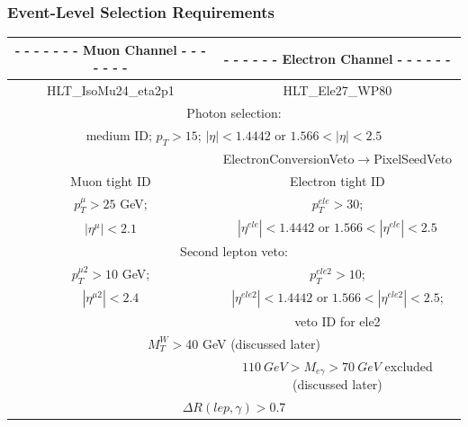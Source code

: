 \begin{frame}\frametitle{Event-Level Selection Requirements}
\begin{table}[h]
\scriptsize
\begin{center}
\begin{tabular}{|c|c|}
{\footnotesize\bfseries{- - - - - - - Muon Channel - - - - - - -}} & 
{\footnotesize\bfseries{- - - - - - Electron Channel - - - - - -}}\\ \hline
 {\scriptsize{HLT\_IsoMu24\_eta2p1}} &  {\scriptsize{HLT\_Ele27\_WP80}}  \\ \hline
 \multicolumn{2}{|c|}{Photon selection:}\\
 \multicolumn{2}{|c|}{\tiny{medium ID; $p_T>15$; $|\eta| < 1.4442$ or $1.566 < |\eta| < 2.5$}}\\ 
               &{\tiny{ ElectronConversionVeto$\rightarrow$PixelSeedVeto}} \\ \hline
 Muon tight ID & Electron tight ID \\ \hline
 \tiny{$p_T^{\mu}>25$ GeV;} &  \tiny{$p_T^{ele}>30$;}  \\ 
 \tiny{$|\eta^{\mu}|<2.1$} & \tiny{$|\eta^{ele}| < 1.4442$ or $1.566 < |\eta^{ele}| < 2.5$} \\ \hline
 \multicolumn{2}{|c|}{Second lepton veto:}\\
 \tiny{$p_T^{\mu2}>10$ GeV;} &  \tiny{$p_T^{ele2}>10$;} \\
 \tiny{$|\eta^{\mu2}|<2.4$}  &   \tiny{$|\eta^{ele2}| < 1.4442$ or $1.566 < |\eta^{ele2}| < 2.5$;} \\
  &   \tiny{veto ID for ele2} \\ \hline
 \multicolumn{2}{|c|}{$M_T^W>$40 GeV (discussed later)} \\ \hline
  & $110~GeV>M_{e\gamma}>70~GeV$ excluded (discussed later) \\ \hline
 \multicolumn{2}{|c|}{$\Delta{R}(lep,\gamma)>0.7$}\\  \hline
\end{tabular}
\end{center}
\end{table}
\end{frame}%



